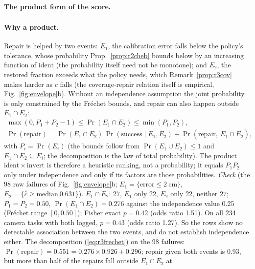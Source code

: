 \documentclass{article}
\newcommand{\ident}{\mathrm{ident}}
\newcommand{\invert}{\mathrm{invert}}
\newcommand{\ph}{\textsuperscript{\dag}}
\begin{document}
\paragraph{The product form of the score\ph.}

\paragraph{Why a product\ph.} Repair is helped by two events: $E_1$, the calibration error falls below the policy's
tolerance, whose probability Prop.~\ref{prop:r2cheb} bounds below by an increasing function of $\ident$ (the
probability itself need not be monotone); and $E_2$, the restored fraction exceeds what the policy needs, which
Remark~\ref{prop:r3cov} makes harder as $c$ falls (the coverage-repair relation itself is empirical,
Fig.~\ref{fig:envelope}b). Without an independence assumption the joint probability is only constrained by the
Fr\'echet bounds, and repair can also happen outside $E_1 \cap E_2$:
\begin{equation}
\begin{gathered}
\max(0, P_1 + P_2 - 1) \le \Pr(E_1 \cap E_2) \le \min(P_1, P_2), \\
\Pr(\text{repair}) = \Pr(E_1\cap E_2)\,\Pr(\text{success} \mid E_1, E_2) + \Pr(\text{repair},\ \overline{E_1\cap E_2}),
\end{gathered}
\label{eq:r3frechet}
\end{equation}
with $P_i = \Pr(E_i)$ (the bounds follow from $\Pr(E_1\cup E_2) \le 1$ and $E_1\cap E_2 \subseteq E_i$; the
decomposition is the law of total probability). The product $\ident \times \invert$ is therefore a heuristic ranking,
not a probability; it equals $P_1P_2$ only under independence and only if its factors are those probabilities.
\emph{Check} (the 98 raw failures of Fig.~\ref{fig:envelope}b; $E_1 =
\{\text{error} \le 2\ \text{cm}\}$, $E_2 = \{\hat c \ge \text{median}\ 0.631\}$). $E_1\cap E_2$: 27, $E_1$ only 22,
$E_2$ only 22, neither 27; $P_1 = P_2 = 0.50$, $\Pr(E_1 \cap E_2) = 0.276$ against the independence value 0.25
(Fr\'echet range $[0, 0.50]$); Fisher exact $p = 0.42$ (odds ratio 1.51). On all 234 camera tasks with both logged,
$p = 0.43$ (odds ratio 1.27). So the rows show no detectable association between the two events, and do not establish
independence either. The decomposition (\ref{eq:r3frechet}) on the 98 failures: $\Pr(\text{repair}) = 0.551 = 0.276
\times 0.926 + 0.296$; repair given both events is 0.93, but more than half of the repairs fall outside $E_1\cap E_2$ at
\end{document}
